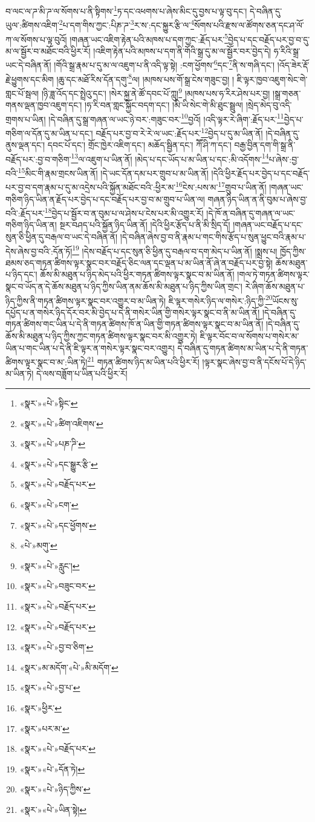 བ་ལང་ལ་ཌ་མི་ཌ་ལ་སོགས་པ་ནི་སྟིགས་\footnote{«སྣར་»«པེ་»སྟིང་}ཏ་དང་འཕགས་པ་ཞེས་མིང་དུ་བྱས་པ་ལྟ་བུ་དང་། དེ་བཞིན་དུ་ཡུལ་:ཚིགས་འཇིག་\footnote{«སྣར་»«པེ་»ཚིག་འཇིགས་}པ་དག་གིས་ཀྱང་:པིཎ་ཌ་\footnote{«སྣར་»«པེ་»པཎ་ཌི་}ར་ས་:དང་སྐྱུར་རྩི་ལ་\footnote{«སྣར་»«པེ་»དང་སྒྱུར་རྩི་}སོགས་པའི་རྫས་ལ་ཚོགས་ཅན་དང་ཤ་ལོ་ཀ་ལ་སོགས་པ་ལྟ་བུའོ། །གཞན་ཡང་འཇིག་རྟེན་པའི་མཁས་པ་དག་ཀྱང་:རྗོད་པར་\footnote{«སྣར་»«པེ་»བརྗོད་པར་}བྱེད་པ་དང་བརྗོད་པར་བྱ་བ་དུ་མ་ལ་སྦྱོར་བ་མཐོང་བའི་ཕྱིར་རོ། །འཇིག་རྟེན་པའི་མཁས་པ་དག་ནི་གོའི་སྒྲ་དུ་མ་ལ་སྦྱོར་བར་བྱེད་དེ། ཧ་རིའི་སྒྲ་ཡང་དེ་བཞིན་ནོ། །གོའི་སྒྲ་རྣམ་པ་དུ་མ་ལ་འཇུག་པ་ནི་འདི་ལྟ་སྟེ། :ངག་ཕྱོགས་\footnote{«སྣར་»«པེ་»ངག་}དང་\footnote{«སྣར་»«པེ་»དང་ཕྱོགས་}ནི་ས་གཞི་དང་། །འོད་ཟེར་རྡོ་རྗེ་ཕྱུགས་དང་མིག །ཆུ་དང་མཐོ་རིས་དོན་དགུ་\footnote{«པེ་»མགུ་}ལ། །མཁས་པས་གོ་སྒྲ་ངེས་གཟུང་བྱ། །
ཇི་ལྟར་ཁྱབ་འཇུག་སེང་གེ་གླང་པོ་སྦལ། །ཉི་ཟླ་འོད་དང་སྤྲེའུ་དང་། །སེར་སྐྱ་ནེ་ཚོ་དབང་པོ་ཀླུ།\footnote{«སྣར་»«པེ་»རླུང་།} །མཁས་པས་ཧ་རིར་ཤེས་པར་བྱ། །སྒྲ་གཅན་གནས་ལྡན་ཁྱབ་འཇུག་དང་། །ཧ་རི་བན་གླང་སྐྱོང་བདག་དང་། །མི་ཡི་སེང་གེ་མི་ཐུང་སྦྲུལ། །སྲེད་མེད་བུ་འདི་གྲགས་པ་ཡིན། །དེ་བཞིན་དུ་སྒྲ་གཞན་ལ་ཡང་ཉེ་བར་:གཟུང་བར་\footnote{«སྣར་»«པེ་»བཟུང་བར་}བྱའོ། །འདི་ལྟར་རེ་ཞིག་:རྗོད་པར་\footnote{«སྣར་»«པེ་»བརྗོད་པར་}བྱེད་པ་གཅིག་ལ་དོན་དུ་མ་ཡིན་པ་དང་། བརྗོད་པར་བྱ་བ་རེ་རེ་ལ་ཡང་:རྗོད་པར་\footnote{«སྣར་»«པེ་»བརྗོད་པར་}བྱེད་པ་དུ་མ་ཡིན་ནོ། །དེ་བཞིན་དུ་ནུས་ལྡན་དང་། དབང་པོ་དང་། གྲོང་ཁྱེར་འཇིག་དང་། མཆོད་སྦྱིན་དང་། ཀཽ་ཤི་ཀ་དང་། བརྒྱ་བྱིན་དག་གི་སྒྲ་ནི་བརྗོད་པར་:བྱ་བ་གཅིག་\footnote{«སྣར་»«པེ་»བྱ་བ་ཅིག་}ལ་འཇུག་པ་ཡིན་ནོ། །མེད་པ་དང་ཡོད་པ་མ་ཡིན་པ་དང་:མི་འདོགས་\footnote{«སྣར་»མ་མདོག་«པེ་»མི་མདོག་}པ་ཞེས་:བྱ་བའི་\footnote{«སྣར་»«པེ་»བྱ་པ་}མིང་གི་རྣམ་གྲངས་ཡིན་ནོ། །དེ་ཡང་དོན་དམ་པར་གྲུབ་པ་མ་ཡིན་ནོ། །དེའི་ཕྱིར་རྗོད་པར་བྱེད་པ་དང་བརྗོད་པར་བྱ་བ་དག་རྣམ་པ་དུ་མ་འདྲེས་པའི་སྐྱོན་མཐོང་བའི་:ཕྱིར་མ་\footnote{«སྣར་»ཕྱིར་}ངེས་:པས་མ་\footnote{«སྣར་»པར་མ་}གྲུབ་པ་ཡིན་ནོ། །གཞན་ཡང་གཅིག་ཉིད་ཡིན་ན་རྗོད་པར་བྱེད་པ་དང་བརྗོད་པར་བྱ་བ་མ་གྲུབ་པ་ཡིན་ལ། གཞན་ཉིད་ཡིན་ན་ནི་བུམ་པ་ཞེས་བྱ་བའི་:རྗོད་པར་\footnote{«སྣར་»«པེ་»བརྗོད་པར་}བྱེད་པ་སྦྱོར་བ་ན་བུམ་པ་ལ་ཤེས་པ་ངེས་པར་མི་འགྱུར་རོ། །དེ་ཁོ་ན་བཞིན་དུ་གཞན་ལ་ཡང་གཅིག་ཉིད་ཡིན་ན། སྔར་བཤད་པའི་སྐྱོན་ཉིད་ཡིན་ནོ། །དེའི་ཕྱིར་རྩོད་པ་ནི་མི་སྲིད་དོ། །གཞན་ཡང་བརྗོད་པ་དང་སུན་ཅི་ཕྱིན་དུ་བརྒལ་བ་ཡང་དེ་བཞིན་ནོ། །དེ་བཞིན་ཞེས་བྱ་བ་ནི་རྣམ་པ་གང་གིས་རྩོད་པ་སུན་ཕྱུང་བའི་རྣམ་པ་དེས་ཞེས་བྱ་བའི་:དོན་ཏོ།\footnote{«སྣར་»«པེ་»དོན་ཏེ།} །དེས་བརྗོད་པ་དང་སུན་ཅི་ཕྱིན་དུ་བརྒལ་བ་དག་མེད་པ་ཡིན་ནོ། །སྨྲས་པ། ཁྱོད་ཀྱིས་ཐམས་ཅད་གཏན་ཚིགས་ལྟར་སྣང་བར་བརྗོད་ཅིང་ལན་དང་ལྡན་པ་མ་ཡིན་ནོ་ཞེ་ན་བརྗོད་པར་བྱ་སྟེ། ཆོས་མཐུན་པ་ཉིད་དང་། ཆོས་མི་མཐུན་པ་ཉིད་མེད་པའི་ཕྱིར་གཏན་ཚིགས་ལྟར་སྣང་བ་མ་ཡིན་ནོ། །གལ་ཏེ་གཏན་ཚིགས་ལྟར་སྣང་བ་ཡོད་ན་དེ་ཆོས་མཐུན་པ་ཉིད་ཀྱིས་ཡིན་ནམ་ཆོས་མི་མཐུན་པ་ཉིད་ཀྱིས་ཡིན་གྲང་། རེ་ཞིག་ཆོས་མཐུན་པ་ཉིད་ཀྱིས་ནི་གཏན་ཚིགས་ལྟར་སྣང་བར་འགྱུར་བ་མ་ཡིན་ཏེ། ཇི་ལྟར་གསེར་ཉིད་ལ་གསེར་:ཉིད་ཀྱི་\footnote{«སྣར་»«པེ་»ཉིད་ཀྱིས་}ཡོངས་སུ་དཔྱོད་པ་ན་གསེར་ཉིད་དོར་བར་མི་བྱེད་པ་དེ་ནི་གསེར་ཡིན་གྱི་གསེར་ལྟར་སྣང་བ་ནི་མ་ཡིན་ནོ། །དེ་བཞིན་དུ་གཏན་ཚིགས་གང་ཡིན་པ་དེ་ནི་གཏན་ཚིགས་ཁོ་ན་ཡིན་གྱི་གཏན་ཚིགས་ལྟར་སྣང་བ་མ་ཡིན་ནོ། །དེ་བཞིན་དུ་ཆོས་མི་མཐུན་པ་ཉིད་ཀྱིས་ཀྱང་གཏན་ཚིགས་ལྟར་སྣང་བར་མི་འགྱུར་ཏེ། ཇི་ལྟར་བོང་བ་ལ་སོགས་པ་གསེར་མ་ཡིན་པ་གང་ཡིན་པ་དེ་ནི་ཇི་ལྟར་ན་གསེར་ལྟར་སྣང་བར་འགྱུར། དེ་བཞིན་དུ་གཏན་ཚིགས་མ་ཡིན་པ་དེ་ནི་གཏན་ཚིགས་ལྟར་སྣང་བ་མ་:ཡིན་ཏེ།\footnote{«སྣར་»«པེ་»ཡིན་སྟེ།} གཏན་ཚིགས་ཉིད་མ་ཡིན་པའི་ཕྱིར་རོ། །ལྟར་སྣང་ཞེས་བྱ་བ་ནི་དངོས་པོ་དེ་ཉིད་མ་ཡིན་ཏེ། དེ་ལས་བཟློག་པ་ཡིན་པའི་ཕྱིར་རོ། 